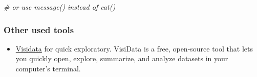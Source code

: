 \documentclass[
  12pt,
]{article}
\newenvironment{Shaded}{\begin{snugshade}}{\end{snugshade}}
\newcommand{\CommentTok}[1]{\textcolor[rgb]{0.56,0.35,0.01}{\textit{#1}}}
\providecommand{\tightlist}{%
  \setlength{\itemsep}{0pt}\setlength{\parskip}{0pt}}
\begin{document}
\begin{Shaded}
\begin{Highlighting}[]
  \CommentTok{\# or use message() instead of cat()}
\end{Highlighting}
\end{Shaded}

\hypertarget{other-used-tools}{%
\subsubsection{Other used tools}\label{other-used-tools}}

\begin{itemize}
\tightlist
\item
  \href{https://www.visidata.org/}{Visidata} for quick exploratory. VisiData is a
  free, open-source tool that lets you quickly open, explore, summarize, and
  analyze datasets in your computer's terminal.
\end{itemize}
\end{document}
